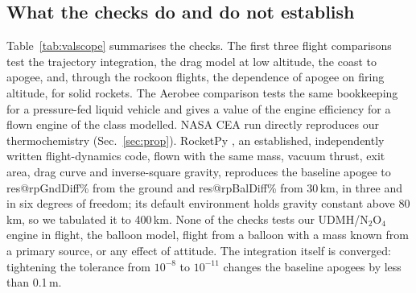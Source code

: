 \documentclass[11pt,a4paper]{article}
\makeatletter
\newcommand{\R}[1]{\csname res@#1\endcsname}
\makeatother
\begin{document}
\subsection{What the checks do and do not establish}

Table~\ref{tab:valscope} summarises the checks. The first three flight comparisons test the trajectory integration, the drag model at low altitude, the coast to apogee, and, through the rockoon flights, the dependence of apogee on firing altitude, for solid rockets. The Aerobee comparison tests the same bookkeeping for a pressure-fed liquid vehicle and gives a value of the engine efficiency for a flown engine of the class modelled. NASA CEA run directly reproduces our thermochemistry (Sec.~\ref{sec:prop}). RocketPy \cite{rocketpy2021}, an established, independently written flight-dynamics code, flown with the same mass, vacuum thrust, exit area, drag curve and inverse-square gravity, reproduces the baseline apogee to \R{rpGndDiff}\% from the ground and \R{rpBalDiff}\% from 30\,km, in three and in six degrees of freedom; its default environment holds gravity constant above 80\,km, so we tabulated it to 400\,km. None of the checks tests our UDMH/N$_2$O$_4$ engine in flight, the balloon model, flight from a balloon with a mass known from a primary source, or any effect of attitude. The integration itself is converged: tightening the tolerance from $10^{-8}$ to $10^{-11}$ changes the baseline apogees by less than 0.1\,m.
\end{document}
